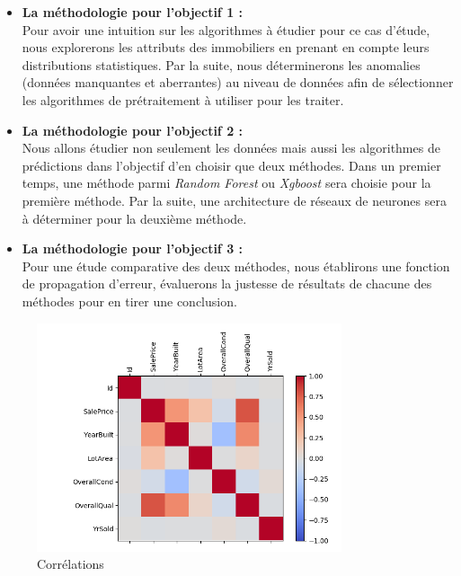 \documentclass[12pt]{extarticle}
\begin{document}
\begin{itemize}
  \item \textbf{La méthodologie pour l’objectif 1 :}\\
Pour avoir une intuition sur les algorithmes à étudier pour ce cas d’étude, nous explorerons les attributs des immobiliers en prenant en compte leurs distributions statistiques. Par la suite, nous déterminerons les anomalies (données manquantes et aberrantes) au niveau de données afin de sélectionner les algorithmes de prétraitement à utiliser pour les traiter. \\

  \item \textbf{La méthodologie pour l’objectif 2 :}\\
Nous allons étudier non seulement les données mais aussi les algorithmes de prédictions dans l’objectif d’en choisir que deux méthodes. Dans un premier temps, une méthode parmi  \emph{Random Forest} ou  \emph{Xgboost} sera choisie pour la première méthode. Par la suite, une architecture de réseaux de neurones sera à déterminer pour la deuxième méthode. \\

  \item \textbf{La méthodologie pour l’objectif 3 :}\\
Pour une étude comparative des deux méthodes, nous établirons une fonction de propagation d’erreur, évaluerons la justesse de résultats de chacune des méthodes pour en tirer une conclusion. \\
\end{itemize}

\begin{figure}[!hb]
    \centering
    \includegraphics[width=0.8\textwidth]{correlation}
    \caption{Corrélations }
\end{figure}
\end{document}

